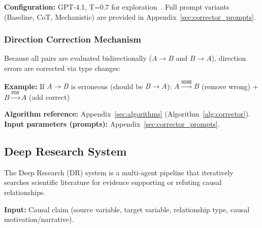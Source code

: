 \textbf{Configuration:} GPT-4.1, T=0.7 for exploration~\citep{madaan2023selfrefineiterativerefinementselffeedback}. Full prompt variants (Baseline, CoT, Mechanistic) are provided in Appendix~\ref{sec:corrector_prompts}.

\subsubsection{Direction Correction Mechanism}
Because all pairs are evaluated bidirectionally ($A \rightarrow B$ and $B \rightarrow A$), direction errors are corrected via type changes:

\textbf{Example:} If $A \rightarrow B$ is erroneous (should be $B \rightarrow A$):
$A \xrightarrow{\texttt{NONE}} B$ (remove wrong) + $B \xrightarrow{\texttt{POS}} A$ (add correct)

\textbf{Algorithm reference:} Appendix~\ref{sec:algorithms} (Algorithm~\ref{alg:corrector}). \textbf{Input parameters (prompts):} Appendix~\ref{sec:corrector_prompts}.

\subsection{Deep Research System}
\label{sec:deep_research_system}

The Deep Research (DR) system is a multi-agent pipeline that iteratively searches scientific literature for evidence supporting or refuting causal relationships.

\textbf{Input:} Causal claim (source variable, target variable, relationship type, causal motivation/narrative).

